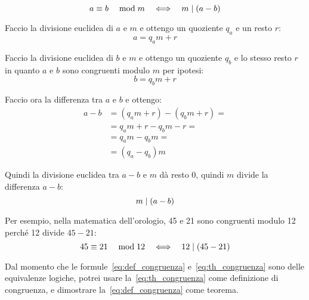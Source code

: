 \begin{teorema}
    \label{th:congruenza}
    \begin{equation}
        \label{eq:th_congruenza}  a \equiv b \quad\bmod m   \quad\Longleftrightarrow\quad  m  \mid  (a - b)
    \end{equation}


    Faccio la divisione euclidea di $a$ e $m$ e ottengo un quoziente $q_a$ e un resto $r$:
    \begin{equation*}
        a = q_a m + r
    \end{equation*}

    Faccio la divisione euclidea di $b$ e $m$ e ottengo un quoziente $q_b$ e lo stesso resto $r$ in quanto $a$ e $b$ sono congruenti modulo $m$ per ipotesi:
    \begin{equation*}
        b = q_b m + r
    \end{equation*}

    Faccio ora la differenza tra $a$ e $b$ e ottengo:
    \begin{align*}
        a - b &= (q_a m + r) - (q_b m + r) = \\
        &= q_a m + r - q_b m - r = \\
        &= q_a m - q_b m = \\
        &= (q_a - q_b)m
    \end{align*}

    Quindi la divisione euclidea tra $a - b$ e $m$ dà resto 0, quindi $m$ divide la differenza $a - b$:
    \begin{equation*}
        m  \mid  (a - b)
    \end{equation*}

\end{teorema}

Per esempio, nella matematica dell'orologio, 45 e 21 sono congruenti modulo 12 perché 12 divide $45 - 21$:
\begin{equation*}
     45 \equiv 21 \quad\bmod 12   \quad\Longleftrightarrow\quad  12  \mid  (45 - 21)
\end{equation*}

Dal momento che le formule~\eqref{eq:def_congruenza} e~\eqref{eq:th_congruenza} sono delle equivalenze logiche, potrei usare la~\eqref{eq:th_congruenza} come definizione di congruenza, e dimostrare la~\eqref{eq:def_congruenza} come teorema.

